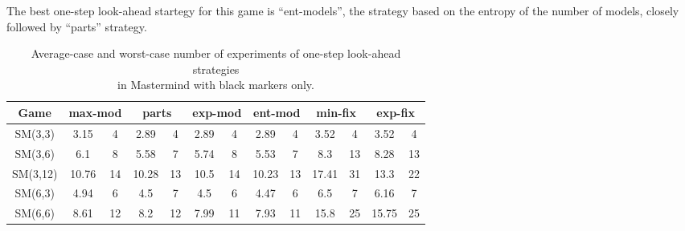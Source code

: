 The best one-step look-ahead startegy for this game is ``ent-models'',
  the strategy based on the entropy of the number of models,
  closely followed by ``parts'' strategy.

\begin{table}[f]
\begin{center}
\begin{small}
\begin{tabular}{|c|c|c|c|c|c|c|c|c|c|c|c|c|}\hline
Game & \multicolumn{2}{c|}{max-mod} & \multicolumn{2}{c|}{parts}
& \multicolumn{2}{c|}{exp-mod} & \multicolumn{2}{c|}{ent-mod}
& \multicolumn{2}{c|}{min-fix} & \multicolumn{2}{c|}{exp-fix}\\ \hline
SM(3,3) & 3.15 &  4 &  2.89 & 4 & 2.89 & 4 & 2.89 & 4 & 3.52 &  4 & 3.52 &  4 \\
SM(3,6) & 6.1 &  8 &  5.58 & 7 & 5.74 & 8 & 5.53 & 7 & 8.3 & 13 &  8.28 &  13 \\
SM(3,12)& 10.76& 14 & 10.28 & 13& 10.5 & 14 & 10.23 & 13 &  17.41 & 31 &  13.3 &  22 \\ \hline
SM(6,3)& 4.94 &  6 &  4.5 & 7 & 4.5 & 6 & 4.47 &  6 & 6.5 & 7 & 6.16 &  7 \\
SM(6,6)& 8.61 & 12 &  8.2 & 12& 7.99 & 11 & 7.93 & 11 &  15.8 &  25 &  15.75 & 25 \\ \hline
\end{tabular}
\end{small}
\caption{Average-case and worst-case number of experiments
  of one-step look-ahead strategies \\ in Mastermind with black markers only.}
\label{tbl:exp-mmb}
\end{center}
\end{table}

